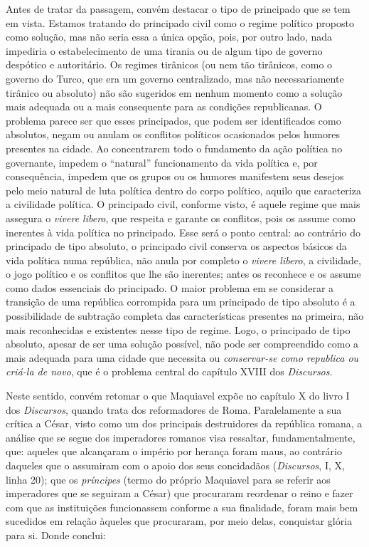 Antes de tratar da passagem, convém destacar o tipo de principado que se
tem em vista. Estamos tratando do principado civil como o regime
político proposto como solução, mas não seria essa a única opção, pois,
por outro lado, nada impediria o estabelecimento de uma tirania ou de
algum tipo de governo despótico e autoritário. Os regimes tirânicos (ou
nem tão tirânicos, como o governo do Turco, que era um governo
centralizado, mas não necessariamente tirânico ou absoluto) não são
sugeridos em nenhum momento como a solução mais adequada ou a mais
consequente para as condições republicanas. O problema parece ser que
esses principados, que podem ser identificados como absolutos, negam ou
anulam os conflitos políticos ocasionados pelos humores presentes na
cidade. Ao concentrarem todo o fundamento da ação política no
governante, impedem o ``natural'' funcionamento da vida política e, por
consequência, impedem que os grupos ou os humores manifestem seus
desejos pelo meio natural de luta política dentro do corpo político,
aquilo que caracteriza a civilidade política. O principado civil,
conforme visto, é aquele regime que mais assegura o \emph{vivere
libero}, que respeita e garante os conflitos, pois os assume como
inerentes à vida política no principado. Esse será o ponto central: ao
contrário do principado de tipo absoluto, o principado civil conserva os
aspectos básicos da vida política numa república, não anula por completo
o \emph{vivere libero}, a civilidade, o jogo político e os conflitos que
lhe são inerentes; antes os reconhece e os assume como dados essenciais
do principado. O maior problema em se considerar a transição de uma
república corrompida para um principado de tipo absoluto é a
possibilidade de subtração completa das características presentes na
primeira, não mais reconhecidas e existentes nesse tipo de regime. Logo,
o principado de tipo absoluto, apesar de ser uma solução possível, não
pode ser compreendido como a mais adequada para uma cidade que necessita
ou \emph{conservar-se como republica ou criá-la de novo}, que é o
problema central do capítulo XVIII dos \emph{Discursos}.

Neste sentido, convém retomar o que Maquiavel expõe no capítulo X do
livro I dos \emph{Discursos}, quando trata dos reformadores de Roma.
Paralelamente a sua crítica a César, visto como um dos principais
destruidores da república romana, a análise que se segue dos imperadores
romanos visa ressaltar, fundamentalmente, que: aqueles que alcançaram o
império por herança foram maus, ao contrário daqueles que o assumiram
com o apoio dos seus concidadãos (\emph{Discursos}, I, X, linha 20); que
os \emph{príncipes} (termo do próprio Maquiavel para se referir aos
imperadores que se seguiram a César) que procuraram reordenar o reino e
fazer com que as instituições funcionassem conforme a sua finalidade,
foram mais bem sucedidos em relação àqueles que procuraram, por meio
delas, conquistar glória para si. Donde conclui:

